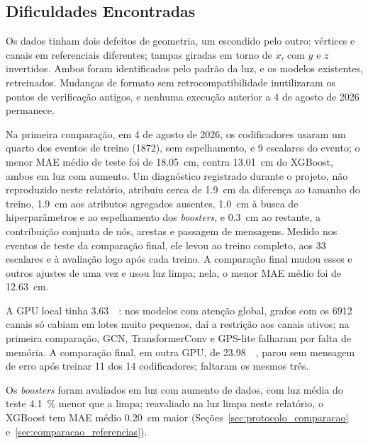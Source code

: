 \subsection{Dificuldades Encontradas}
\label{sec:dificuldades}

Os dados tinham dois defeitos de geometria, um escondido pelo outro: vértices e canais em referenciais diferentes; tampas giradas em torno de $x$, com $y$ e $z$ invertidos. Ambos foram identificados pelo padrão da luz, e os modelos existentes, retreinados. Mudanças de formato sem retrocompatibilidade inutilizaram os pontos de verificação antigos, e nenhuma execução anterior a 4 de agosto de 2026 permanece.

Na primeira comparação, em 4 de agosto de 2026, os codificadores usaram um quarto dos eventos de treino (\num{1872}), sem espelhamento, e \num{9} escalares do evento; o menor MAE médio de teste foi de \qty{18.05}{\cm}, contra \qty{13.01}{\cm} do XGBoost, ambos em luz com aumento. Um diagnóstico registrado durante o projeto, não reproduzido neste relatório, atribuiu cerca de \qty{1.9}{\cm} da diferença ao tamanho do treino, \qty{1.9}{\cm} aos atributos agregados ausentes, \qty{1.0}{\cm} à busca de hiperparâmetros e ao espelhamento dos \textit{boosters}, e \qty{0.3}{\cm} ao restante, a contribuição conjunta de nós, arestas e passagem de mensagens. Medido nos eventos de teste da comparação final, ele levou ao treino completo, aos \num{33} escalares e à avaliação logo após cada treino. A comparação final mudou esses e outros ajustes de uma vez e usou luz limpa; nela, o menor MAE médio foi de \qty{12.63}{\cm}.

A GPU local tinha \qty{3.63}{\gibi\byte}: nos modelos com atenção global, grafos com os \num{6912} canais só cabiam em lotes muito pequenos, daí a restrição aos canais ativos; na primeira comparação, GCN, TransformerConv e GPS-lite falharam por falta de memória. A comparação final, em outra GPU, de \qty{23.98}{\gibi\byte}, parou sem mensagem de erro após treinar \num{11} dos \num{14} codificadores; faltaram os mesmos três.

Os \textit{boosters} foram avaliados em luz com aumento de dados, com luz média do teste \qty{4.1}{\percent} menor que a limpa; reavaliado na luz limpa neste relatório, o XGBoost tem MAE médio \qty{0.20}{\cm} maior (Seções~\ref{sec:protocolo_comparacao} e~\ref{sec:comparacao_referencias}).
